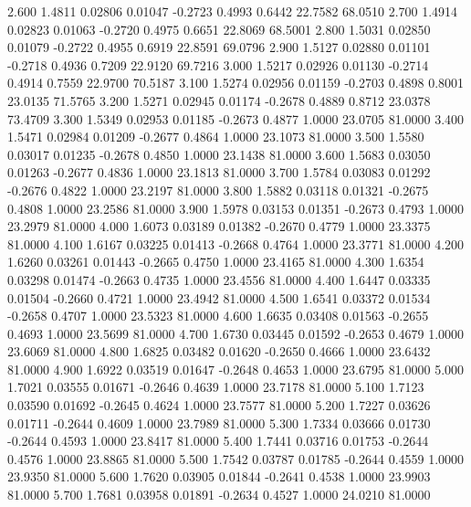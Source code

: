    2.600   1.4811   0.02806   0.01047  -0.2723   0.4993   0.6442  22.7582  68.0510
   2.700   1.4914   0.02823   0.01063  -0.2720   0.4975   0.6651  22.8069  68.5001
   2.800   1.5031   0.02850   0.01079  -0.2722   0.4955   0.6919  22.8591  69.0796
   2.900   1.5127   0.02880   0.01101  -0.2718   0.4936   0.7209  22.9120  69.7216
   3.000   1.5217   0.02926   0.01130  -0.2714   0.4914   0.7559  22.9700  70.5187
   3.100   1.5274   0.02956   0.01159  -0.2703   0.4898   0.8001  23.0135  71.5765
   3.200   1.5271   0.02945   0.01174  -0.2678   0.4889   0.8712  23.0378  73.4709
   3.300   1.5349   0.02953   0.01185  -0.2673   0.4877   1.0000  23.0705  81.0000
   3.400   1.5471   0.02984   0.01209  -0.2677   0.4864   1.0000  23.1073  81.0000
   3.500   1.5580   0.03017   0.01235  -0.2678   0.4850   1.0000  23.1438  81.0000
   3.600   1.5683   0.03050   0.01263  -0.2677   0.4836   1.0000  23.1813  81.0000
   3.700   1.5784   0.03083   0.01292  -0.2676   0.4822   1.0000  23.2197  81.0000
   3.800   1.5882   0.03118   0.01321  -0.2675   0.4808   1.0000  23.2586  81.0000
   3.900   1.5978   0.03153   0.01351  -0.2673   0.4793   1.0000  23.2979  81.0000
   4.000   1.6073   0.03189   0.01382  -0.2670   0.4779   1.0000  23.3375  81.0000
   4.100   1.6167   0.03225   0.01413  -0.2668   0.4764   1.0000  23.3771  81.0000
   4.200   1.6260   0.03261   0.01443  -0.2665   0.4750   1.0000  23.4165  81.0000
   4.300   1.6354   0.03298   0.01474  -0.2663   0.4735   1.0000  23.4556  81.0000
   4.400   1.6447   0.03335   0.01504  -0.2660   0.4721   1.0000  23.4942  81.0000
   4.500   1.6541   0.03372   0.01534  -0.2658   0.4707   1.0000  23.5323  81.0000
   4.600   1.6635   0.03408   0.01563  -0.2655   0.4693   1.0000  23.5699  81.0000
   4.700   1.6730   0.03445   0.01592  -0.2653   0.4679   1.0000  23.6069  81.0000
   4.800   1.6825   0.03482   0.01620  -0.2650   0.4666   1.0000  23.6432  81.0000
   4.900   1.6922   0.03519   0.01647  -0.2648   0.4653   1.0000  23.6795  81.0000
   5.000   1.7021   0.03555   0.01671  -0.2646   0.4639   1.0000  23.7178  81.0000
   5.100   1.7123   0.03590   0.01692  -0.2645   0.4624   1.0000  23.7577  81.0000
   5.200   1.7227   0.03626   0.01711  -0.2644   0.4609   1.0000  23.7989  81.0000
   5.300   1.7334   0.03666   0.01730  -0.2644   0.4593   1.0000  23.8417  81.0000
   5.400   1.7441   0.03716   0.01753  -0.2644   0.4576   1.0000  23.8865  81.0000
   5.500   1.7542   0.03787   0.01785  -0.2644   0.4559   1.0000  23.9350  81.0000
   5.600   1.7620   0.03905   0.01844  -0.2641   0.4538   1.0000  23.9903  81.0000
   5.700   1.7681   0.03958   0.01891  -0.2634   0.4527   1.0000  24.0210  81.0000
